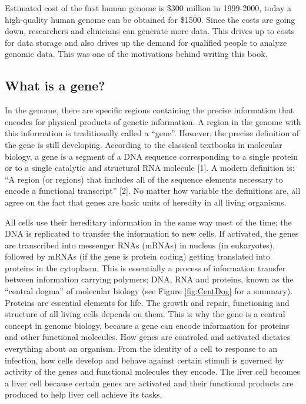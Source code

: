 \documentclass[12pt,]{krantz}
\begin{document}
Estimated cost
of the first human genome is \$300 million in 1999-2000, today a high-quality human genome
can be obtained for \$1500. Since the costs are going down, researchers and clinicians
can generate more data. This drives up to costs for data storage and also drives
up the demand for qualified people to analyze genomic data. This was one of the
motivations behind writing this book.

\hypertarget{what-is-a-gene}{%
\subsection{What is a gene?}\label{what-is-a-gene}}

In the genome, there are specific regions containing the precise information that
encodes for physical products of genetic information. A region in the genome
with this information is traditionally called a ``gene''. However, the
precise definition of the gene is still developing. According to the classical
textbooks in molecular biology, a gene is a segment of a DNA sequence
corresponding to a single protein or to a single catalytic and structural RNA
molecule {[}1{]}. A modern definition is: ``A region (or regions) that includes all
of the sequence elements necessary to encode a functional transcript'' {[}2{]}. No
matter how variable the definitions are, all agree on the fact that genes are
basic units of heredity in all living organisms.

All cells use their hereditary
information in the same way most of the time; the DNA is replicated to
transfer the information to new cells. If activated, the genes are transcribed into
messenger RNAs (mRNAs) in nucleus (in eukaryotes), followed by mRNAs (if the
gene is protein coding) getting translated into proteins in the cytoplasm. This is
essentially a process of information transfer between information carrying
polymers; DNA, RNA and proteins, known as the ``central dogma'' of molecular
biology (see Figure \ref{fig:CentDog} for a summary).
Proteins are essential elements for life.
The growth and repair, functioning and structure of all living cells depends on them.
This is why the gene is a central
concept in genome biology, because a gene can encode information for proteins and other
functional molecules. How genes are controled and activated dictates
everything about an organism. From the identity of a cell to response to
an infection, how cells develop and behave against certain stimuli is governed
by activity of the genes and functional molecules they encode. The liver cell becomes a liver cell because certain
genes are activated and their functional products are produced to help liver
cell achieve its tasks.
\end{document}
